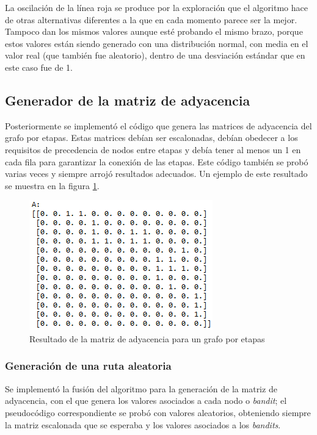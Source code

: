 La oscilación de la línea roja se produce por la exploración que el algoritmo hace de otras alternativas diferentes a la que en cada momento parece ser la mejor. Tampoco dan los mismos valores aunque esté probando el mismo brazo, porque estos valores están siendo generado con una distribución normal, con media en el valor real (que también fue aleatorio), dentro de una desviación estándar que en este caso fue de 1. 

\subsection{Generador de la matriz de adyacencia}

Posteriormente se implementó el código que genera las matrices de adyacencia del grafo por etapas. Estas matrices debían ser escalonadas, debían obedecer a los requisitos de precedencia de nodos entre etapas y debía tener al menos un 1 en cada fila para garantizar la conexión de las etapas. Este código también se probó varias veces y siempre arrojó resultados adecuados. Un ejemplo de este resultado se muestra en la figura \ref{MatrizAy}.

\begin{figure} [H]
    \label{Resul2}
	\centering
	\includegraphics[scale=0.8]{MatrizAy}
	\caption{Resultado de la matriz de adyacencia para un grafo por etapas}
	\label{MatrizAy}
\end{figure}

\subsubsection{Generación de una ruta aleatoria}

Se implementó la fusión del algoritmo para la generación de la matriz de adyacencia, con el que genera los valores asociados a cada nodo o \textit{bandit}; el pseudocódigo correspondiente se probó con valores aleatorios, obteniendo siempre la matriz escalonada que se esperaba y los valores asociados a los \textit{bandits}.

